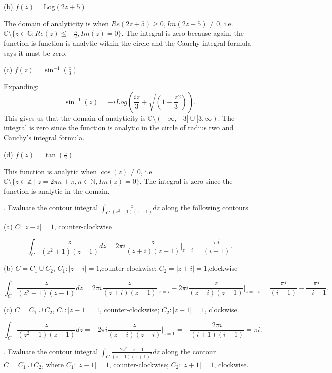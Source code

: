 \documentclass[letterpaper, reqno,11pt]{article}
\begin{document}
(b) $ f(z) = \mbox{Log} (2z+5)$

The domain of analyticity is when $Re(2z+5)\geq 0, Im(2z+5)\neq 0$, i.e. $\mathbb{C}\setminus \{z\in\mathbb{C} : Re(z)\leq -\frac{5}{2}, Im(z)=0\} $. The integral is zero because again, the function is function is analytic within the circle and the Cauchy integral formula says it must be zero. 

(c) $ f(z)= \sin^{-1} (\frac{z}{3})$

Expanding: 
\[
\sin^{-1}(z)=-iLog\left( \frac{iz}{3}+\sqrt{ (1-\frac{z}{3}^2)} \right) 
.\]
This gives us that the domain of analyticity is $\mathbb{C}\setminus(-\infty, -3]\cup [3, \infty) $. The integral is zero since the function is analytic in the circle of radius two and Cauchy's integral formula. 

(d) $ f(z)= \tan (\frac{z}{2}) $

This function is analytic when $\cos(z)\neq 0$, i.e. $ \mathbb{C}\setminus\{z\in\mathbb Z\mid z=2\pi n+\pi, n\in\mathbb{N}, Im(z)=0\} $. The integral is zero since the function is analytic in the domain. 

\medskip





. Evaluate the contour integral $\int_{C} \frac{z}{ (z^2+1)(z-1)} dz$ along the following contours

(a) $C: | z-i|=1$, counter-clockwise

\[
\int_{C} \frac{z}{ (z^2+1)(z-1)} dz=2\pi i\frac{z}{(z+i)(z-1)}\bigg|_{z=i}=\frac{\pi i}{(i-1)}
.\]

(b) $C= C_1 \cup C_2$, $C_1: |z-i|=1$,counter-clockwise; $C_2= |z+i|=1$,clockwise

\[
\int_{C} \frac{z}{ (z^2+1)(z-1)} dz=2\pi i\frac{z}{(z+i)(z-1)}\bigg|_{z=i}-2\pi i\frac{z}{(z-i)(z-1)}\bigg|_{z=-i}=\frac{\pi i}{(i-1)}-\frac{\pi i}{-i-1}
.\]

(c) $C= C_1 \cup C_2 $, $C_1: |z-1|=1$, counter-clockwise; $C_2:  |z+1|=1$, clockwise.

\[
\int_{C} \frac{z}{ (z^2+1)(z-1)} dz=-2\pi i\frac{z}{(z-i)(z+i)}\bigg|_{z=1}=-\frac{2 \pi i}{(i+1)(i-1)}=\pi i
.\]



\medskip


. Evaluate the contour integral $ \int_{C} \frac{2z^2-z+1}{ (z-1)(z+1)^2} dz $ along the contour $C= C_1 \cup C_2 $, where $C_1: |z-1|=1$, counter-clockwise; $C_2:  |z+1|=1$, clockwise.
\end{document}
